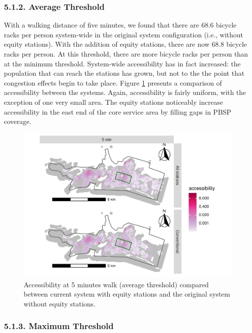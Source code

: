 \documentclass[]{elsarticle} %
\begin{document}
\hypertarget{average-threshold}{%
\subsubsection{5.1.2. Average Threshold}\label{average-threshold}}

With a walking distance of five minutes, we found that there are 68.6
bicycle racks per person system-wide in the original system
configuration (i.e., without equity stations). With the addition of
equity stations, there are now 68.8 bicycle racks per person. At this
threshold, there are more bicycle racks per person than at the minimum
threshold. System-wide accessibility has in fact increased: the
population that can reach the stations has grown, but not to the the
point that congestion effects begin to take place. Figure
\ref{fig:figure-7} presents a comparison of accessibility between the
systems. Again, accessibility is fairly uniform, with the exception of
one very small area. The equity stations noticeably increase
accessibility in the east end of the core service area by filling gaps
in PBSP coverage.

\begin{figure}

{\centering \includegraphics[width=0.9\linewidth]{Bike-share-spatial-equity_files/figure-latex/figure-7-1} 

}

\caption{Accessibility at 5 minutes walk (average threshold) compared between current system with equity stations and the original system without equity stations.}\label{fig:figure-7}
\end{figure}

\hypertarget{maximum-threshold}{%
\subsubsection{5.1.3. Maximum Threshold}\label{maximum-threshold}}
\end{document}
